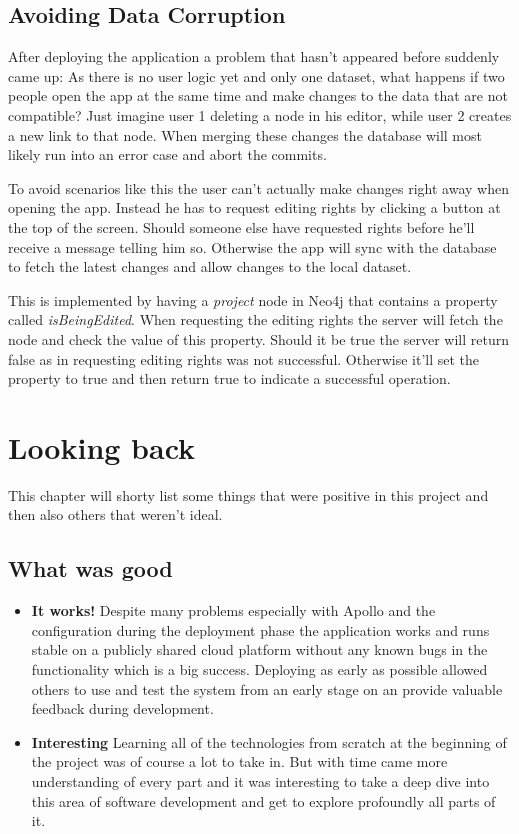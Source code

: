 \newpage
\section{Avoiding Data Corruption}
After deploying the application a problem that hasn't appeared before suddenly came up: As there is no user logic yet and only one dataset, what happens if two people open the app at the same time and make changes to the data that are not compatible? Just imagine user 1 deleting a node in his editor, while user 2 creates a new link to that node. When merging these changes the database will most likely run into an error case and abort the commits.

To avoid scenarios like this the user can't actually make changes right away when opening the app. Instead he has to request editing rights by clicking a button at the top of the screen. Should someone else have requested rights before he'll receive a message telling him so. Otherwise the app will sync with the database to fetch the latest changes and allow changes to the local dataset.

This is implemented by having a \emph{project} node in Neo4j that contains a property called \emph{isBeingEdited}. When requesting the editing rights the server will fetch the node and check the value of this property. Should it be true the server will return false as in requesting editing rights was not successful. Otherwise it'll set the property to true and then return true to indicate a successful operation.

\chapter{Looking back}
\label{chap:LB}
This chapter will shorty list some things that were positive in this project and then also others that weren't ideal.

\section{What was good}
\begin{itemize}
\item \textbf{It works!} Despite many problems especially with Apollo and the configuration during the deployment phase the application works and runs stable on a publicly shared cloud platform without any known bugs in the functionality which is a big success. Deploying as early as possible allowed others to use and test the system from an early stage on an provide valuable feedback during development.

\item \textbf{Interesting} Learning all of the technologies from scratch at the beginning of the project was of course a lot to take in. But with time came more understanding of every part and it was interesting to take a deep dive into this area of software development and get to explore profoundly all parts of it.
\end{itemize}

